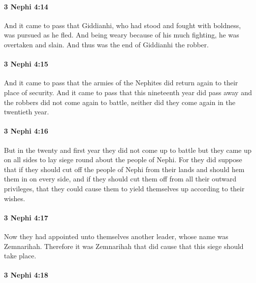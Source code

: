 		\paragraph{3 Nephi 4:14} %
			\label{3NEPHI-4-14}

			And it came to pass that Giddianhi,
			who had stood and fought with boldness,
			was pursued as he fled.
			And being weary because of his much fighting,
			he was overtaken and slain.
			And thus was the end of Giddianhi the robber.

		\paragraph{3 Nephi 4:15} %
			\label{3NEPHI-4-15}

			And it came to pass that
			the armies of the Nephites did return again to their place of security.
			And it came to pass that this nineteenth year did pass away
			and the robbers did not come again to battle,
			neither did they come again in the twentieth year.

		\paragraph{3 Nephi 4:16} %
			\label{3NEPHI-4-16}

			But in the twenty and first year they did not come up to battle
			but they came up on all sides to lay siege round about the people of Nephi.
			For they did suppose that
			if they should cut off the people of Nephi from their lands
			and should hem them in on every side,
			and if they should cut them off from all their outward privileges,
			that they could cause them to yield themselves up according to their wishes.

		\paragraph{3 Nephi 4:17} %
			\label{3NEPHI-4-17}

			Now they had appointed unto themselves another leader,
			whose name was Zemnarihah.
			Therefore it was Zemnarihah that did cause that this siege should take place.

		\paragraph{3 Nephi 4:18} %
			\label{3NEPHI-4-18}

